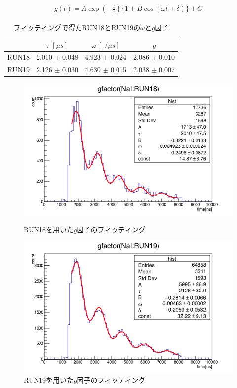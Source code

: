 \begin{gather}
  g(t) = A\exp(-\frac{t}{\tau})\{1+B\cos(\omega t+\delta)\}+C   \label{eq:gfactor}
\end{gather}
\begin{table}[H]
  \caption{フィッティングで得たRUN18とRUN19の$\omega$と$g$因子}
  \centering
  \begin{tabular}{cccc}\toprule
    & $\tau \;[\mu s]$ & $\omega \;[\;/\mu s]$ & $g$ \\ \midrule
    RUN18 & 2.010 $\pm$ 0.048 & 4.923 $\pm$ 0.024 & 2.086 $\pm$ 0.010  \\
    RUN19 & 2.126 $\pm$ 0.030 & 4.630 $\pm$ 0.015 & 2.038 $\pm$ 0.007 \\ \bottomrule
  \end{tabular}
  \label{tab:gfactor_result}
\end{table}

\begin{figure}[H]
  \begin{minipage}{0.5\hsize}
    \includegraphics[width  = 1.0\textwidth]{figure/mino/gfactor_ratio_RUN18.png}
    \caption{RUN18を用いた$g$因子のフィッティング}
  \end{minipage}
  \begin{minipage}{0.5\hsize}
    \includegraphics[width  = 1.0\textwidth]{figure/mino/gfactor_ratio_RUN19.png}
    \caption{RUN19を用いた$g$因子のフィッティング}
  \end{minipage}
\end{figure}

